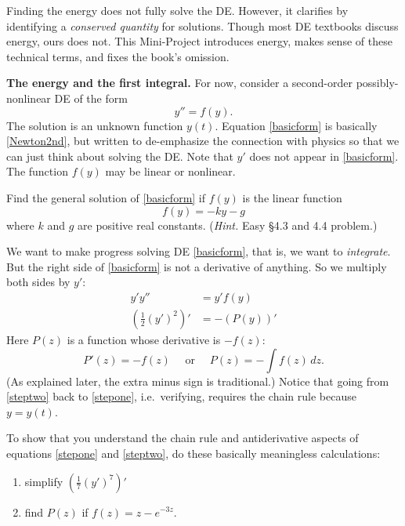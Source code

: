 \documentclass[12pt]{article}
\theoremstyle{definition}
\begin{document}
Finding the energy does not fully solve the DE.  However, it clarifies by identifying a \emph{conserved quantity} for solutions.  Though most DE textbooks discuss energy, ours does not.  This Mini-Project introduces energy, makes sense of these technical terms, and fixes the book's omission.

\medskip
\textbf{The energy and the first integral.}  For now, consider a second-order possibly-nonlinear DE of the form
\begin{equation}
y'' = f(y). \label{basicform}
\end{equation}
The solution is an unknown function $y(t)$.  Equation \eqref{basicform} is basically \eqref{Newton2nd}, but written to de-emphasize the connection with physics so that we can just think about solving the DE.  Note that $y'$ does not appear in \eqref{basicform}.  The function $f(y)$ may be linear or nonlinear.

\begin{exerpart}
Find the general solution of \eqref{basicform} if $f(y)$ is the linear function
    $$f(y) = -ky - g$$
where $k$ and $g$ are positive real constants.  (\emph{Hint.}  Easy \S 4.3 and 4.4 problem.)
\end{exerpart}

We want to make progress solving DE \eqref{basicform}, that is, we want to \emph{integrate}.  But the right side of \eqref{basicform} is not a derivative of anything.  So we multiply both sides by $y'$:
\begin{align}
y' y'' &= y' f(y) \label{stepone} \\
\left(\frac{1}{2} (y')^2\right)' &= - \left(P(y)\right)'  \label{steptwo}
\end{align}
Here $P(z)$ is a function whose derivative is $-f(z)$:
    $$P'(z)=-f(z) \quad \text{ or } \quad P(z) = -\int f(z)\,dz.$$
(As explained later, the extra minus sign is traditional.)  Notice that going from \eqref{steptwo} back to \eqref{stepone}, i.e.~verifying, requires the chain rule because $y=y(t)$.

\begin{exerpart}
To show that you understand the chain rule and antiderivative aspects of equations \eqref{stepone} and \eqref{steptwo}, do these basically meaningless calculations:
\renewcommand{\labelenumi}{\roman{enumi})}
\begin{enumerate}
\item simplify $\left(\frac{1}{7} (y')^7\right)'$
\item find $P(z)$ if $f(z)=z-e^{-3 z}$.
\end{enumerate}
\end{exerpart}
\end{document}

